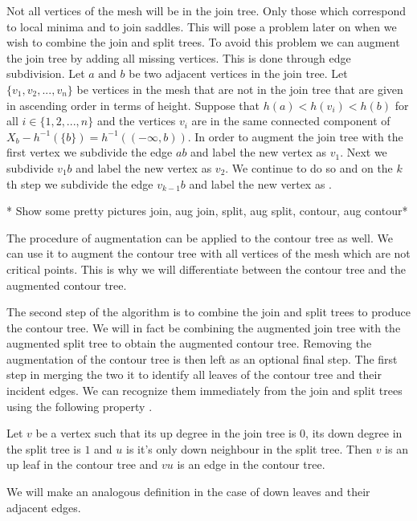 Not all vertices of the mesh will be in the join tree. Only those which correspond to local minima and to join saddles. This will pose a problem later on when we wish to combine the join and split trees. To avoid this problem we can augment the join tree by adding all missing vertices. This is done through edge subdivision. Let $a \text{ and } b$ be two adjacent vertices in the join tree.  Let $\{v_1, v_2, ..., v_n\}$ be vertices in the mesh that are not in the join tree that are given in ascending order in terms of height.  Suppose that $h(a) < h(v_i) < h(b)$ for all $i \in \{1, 2, ..., n\}$ and the vertices $v_i$ are in the same connected component of $X_b - h^{-1}(\{b\}) = h^{-1}((-\infty, b))$. In order to augment the join tree with the first vertex we subdivide the edge $ab$ and label the new vertex as $v_1$. Next we subdivide $v_1b$ and label the new vertex as $v_2$. We continue to do so and on the $k$th step we subdivide the edge
$ v_{k-1}b $ and label the new vertex as .

* Show some pretty pictures join, aug join, split, aug split, contour, aug contour*

The procedure of augmentation can be applied to the contour tree as well. We can use it to augment the contour tree with all vertices of the mesh which are not critical points. This is why we will differentiate between the contour tree and the augmented contour tree.

The second step of the algorithm is to combine the join and split trees to produce the contour tree. We will in fact be combining the augmented join tree with the augmented split tree to obtain the augmented contour tree. Removing the augmentation of the contour tree is then left as an optional final step. The first step in merging the two it to identify all leaves of the contour tree and their incident edges. We can recognize them immediately from the join and split trees using the following property \cite{carr-masters}.

\begin{defn} Let $v$ be a vertex such that its up degree in the join tree is $0$, its down degree in the split tree is $1$ and $u$ is it's only down neighbour in the split tree. Then $v$ is an up leaf in the contour tree and $vu$ is an edge in the contour tree.  \end{defn}

We will make an analogous definition in the case of down leaves and their adjacent edges.

